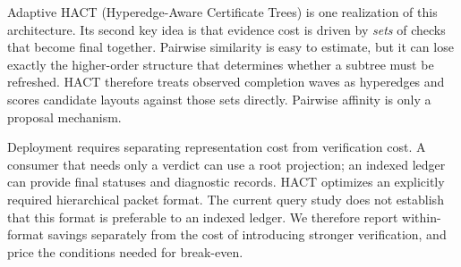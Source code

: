 \documentclass[11pt]{article}
\theoremstyle{definition}\newtheorem{definition}[theorem]{Definition}
\begin{document}
Adaptive HACT (Hyperedge-Aware Certificate Trees) is one realization of this architecture. Its second key idea is that evidence cost is driven by \emph{sets} of checks that become final together. Pairwise similarity is easy to estimate, but it can lose exactly the higher-order structure that determines whether a subtree must be refreshed. HACT therefore treats observed completion waves as hyperedges and scores candidate layouts against those sets directly. Pairwise affinity is only a proposal mechanism.

Deployment requires separating representation cost from verification cost.
A consumer that needs only a verdict can use a root projection; an indexed
ledger can provide final statuses and diagnostic records. HACT optimizes an
explicitly required hierarchical packet format. The current query study does
not establish that this format is preferable to an indexed ledger. We
therefore report within-format savings separately from the cost of introducing
stronger verification, and price the conditions needed for break-even.
\end{document}
